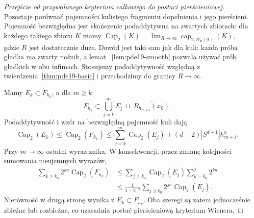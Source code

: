 \begin{proof}[Przejście od przywołanego kryterium całkowego do postaci pierścieniowej]
Pozostaje porównać pojemności kulistego fragmentu
dopełnienia i jego pierścieni. Pojemność bezwzględna
jest skończenie podaddytywna na zwartych zbiorach:
dla każdego takiego zbioru $K$ mamy
$\operatorname{Cap}_2(K)=\lim_{R\to\infty}
\operatorname{cap}_{2,B_R(0)}(K)$, gdzie $R$ jest
dostatecznie duże. Dowód jest taki sam jak dla kuli:
każda próba gładka ma zwarty nośnik, a lemat
~\ref{lem:pde19-smooth} pozwala używać prób gładkich
w obu infimach. Stosujemy podaddytywność względną
z twierdzenia~\ref{thm:pde19-basic} i przechodzimy
do granicy $R\to\infty$.

Mamy $E_k\subset F_{h_k}$, a dla $m\ge k$
\[
 F_{h_k}\subset\bigcup_{j=k}^m E_j
 \ \cup\ \overline{B_{h_{m+1}}(x_0)}.
\]
Podaddytywność i wzór na bezwzględną pojemność kuli
dają
\[
 \operatorname{Cap}_2(E_k)\le\operatorname{Cap}_2(F_{h_k})
 \le\sum_{j=k}^m\operatorname{Cap}_2(E_j)
 +(d-2)|S^{d-1}|h_{m+1}^a.
\]
Przy $m\to\infty$ ostatni wyraz znika.
W konsekwencji, przez zmianę kolejności sumowania
nieujemnych wyrazów,
\[
 \begin{split}
 \sum_{k\ge k_0}2^{ka}\operatorname{Cap}_2(F_{h_k})
 &\le \sum_{j\ge k_0}\operatorname{Cap}_2(E_j)
       \sum_{k=k_0}^j2^{ka}\\
 &\le\frac{1}{1-2^{-a}}
       \sum_{j\ge k_0}2^{ja}\operatorname{Cap}_2(E_j).
 \end{split}
\]
Nierówność w drugą stronę wynika z $E_k\subset F_{h_k}$.
Oba szeregi są zatem jednocześnie zbieżne lub rozbieżne,
co uzasadnia postać pierścieniową kryterium Wienera.
\end{proof}

